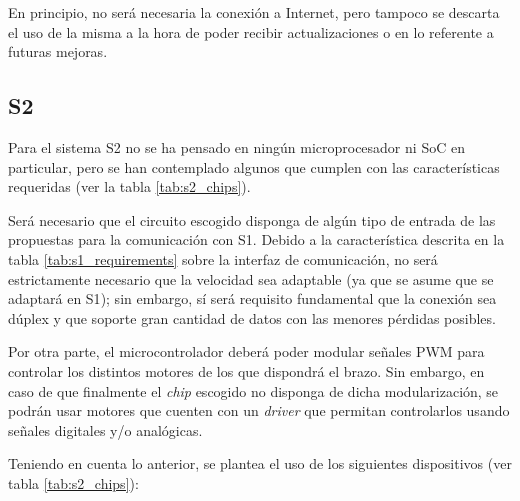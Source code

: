 En principio, no será necesaria la conexión a Internet, pero tampoco se descarta el uso de la misma a la hora de poder recibir actualizaciones o en lo referente a futuras mejoras.

\subsection*{\ac{S2}}
Para el sistema \ac{S2} no se ha pensado en ningún microprocesador ni \ac{SoC} en particular, pero se han contemplado algunos que cumplen con las características requeridas (ver la tabla \ref{tab:s2_chips}).

Será necesario que el circuito escogido disponga de algún tipo de entrada de las propuestas para la comunicación con \ac{S1}. Debido a la característica descrita en la tabla \ref{tab:s1_requirements} sobre la interfaz de comunicación, no será estrictamente necesario que la velocidad sea adaptable (ya que se asume que se adaptará en \ac{S1}); sin embargo, sí será requisito fundamental que la conexión sea dúplex y que soporte gran cantidad de datos con las menores pérdidas posibles.

Por otra parte, el microcontrolador deberá poder modular señales \ac{PWM} para controlar los distintos motores de los que dispondrá el brazo. Sin embargo, en caso de que finalmente el \textit{chip} escogido no disponga de dicha modularización, se podrán usar motores que cuenten con un \textit{driver} que permitan controlarlos usando señales digitales y/o analógicas.

Teniendo en cuenta lo anterior, se plantea el uso de los siguientes dispositivos (ver tabla \ref{tab:s2_chips}):

